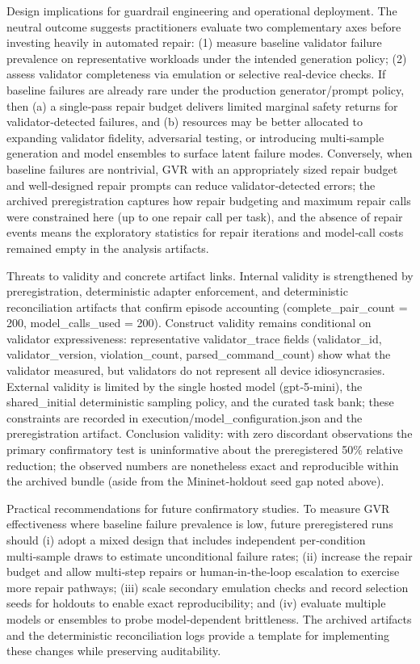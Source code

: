 \documentclass[conference]{IEEEtran}
\begin{document}
Design implications for guardrail engineering and operational deployment. The neutral outcome suggests practitioners evaluate two complementary axes before investing heavily in automated repair: (1) measure baseline validator failure prevalence on representative workloads under the intended generation policy; (2) assess validator completeness via emulation or selective real‑device checks. If baseline failures are already rare under the production generator/prompt policy, then (a) a single‑pass repair budget delivers limited marginal safety returns for validator‑detected failures, and (b) resources may be better allocated to expanding validator fidelity, adversarial testing, or introducing multi‑sample generation and model ensembles to surface latent failure modes. Conversely, when baseline failures are nontrivial, GVR with an appropriately sized repair budget and well‑designed repair prompts can reduce validator‑detected errors; the archived preregistration captures how repair budgeting and maximum repair calls were constrained here (up to one repair call per task), and the absence of repair events means the exploratory statistics for repair iterations and model‑call costs remained empty in the analysis artifacts.

Threats to validity and concrete artifact links. Internal validity is strengthened by preregistration, deterministic adapter enforcement, and deterministic reconciliation artifacts that confirm episode accounting (complete\_pair\_count = 200, model\_calls\_used = 200). Construct validity remains conditional on validator expressiveness: representative validator\_trace fields (validator\_id, validator\_version, violation\_count, parsed\_command\_count) show what the validator measured, but validators do not represent all device idiosyncrasies. External validity is limited by the single hosted model (gpt‑5‑mini), the shared\_initial deterministic sampling policy, and the curated task bank; these constraints are recorded in execution/model\_configuration.json and the preregistration artifact. Conclusion validity: with zero discordant observations the primary confirmatory test is uninformative about the preregistered 50\% relative reduction; the observed numbers are nonetheless exact and reproducible within the archived bundle (aside from the Mininet‑holdout seed gap noted above).

Practical recommendations for future confirmatory studies. To measure GVR effectiveness where baseline failure prevalence is low, future preregistered runs should (i) adopt a mixed design that includes independent per‑condition multi‑sample draws to estimate unconditional failure rates; (ii) increase the repair budget and allow multi‑step repairs or human‑in‑the‑loop escalation to exercise more repair pathways; (iii) scale secondary emulation checks and record selection seeds for holdouts to enable exact reproducibility; and (iv) evaluate multiple models or ensembles to probe model‑dependent brittleness. The archived artifacts and the deterministic reconciliation logs provide a template for implementing these changes while preserving auditability.
\end{document}
